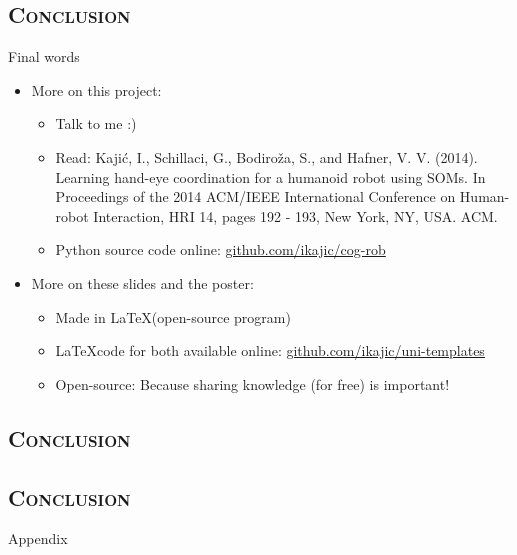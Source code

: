 \documentclass[xcolor=x11names,dvipsnames,compress]{beamer}
\renewcommand{\(}{\begin{columns}}
\renewcommand{\)}{\end{columns}}
\newcommand{\<}[1]{\begin{column}{#1}}
\renewcommand{\>}{\end{column}}
\begin{document}
\subsection{\scshape Conclusion}
\begin{frame}{Final words}
\begin{itemize}          
     \item More on this project:
     	\begin{itemize}
     		\item Talk to me :)
     		\item Read: \small{Kaji\'c, I., Schillaci, G., Bodiro\v{z}a, S., and Hafner, V. V. (2014). Learning hand-eye coordination for a humanoid robot using SOMs. In Proceedings of the 2014 ACM/IEEE International
Conference on Human-robot Interaction, HRI 14, pages 192 - 193, New York, NY, USA. ACM.}
	      \item Python source code online: \url{github.com/ikajic/cog-rob}
     	\end{itemize}
     \item More on these slides and the poster:
     \begin{itemize}
      \item Made in \LaTeX (open-source program)
      \item \LaTeX code for both available online: \url{github.com/ikajic/uni-templates}
      \item Open-source: Because sharing knowledge (for free) is important!
     \end{itemize}     
\end{itemize}
    
\end{frame}



\subsection{\scshape Conclusion}
\begin{frame}        
  
  
\end{frame}

\subsection{\scshape Conclusion}
\begin{frame}[noframenumbering]
\Large Appendix
\end{frame}
\end{document}
